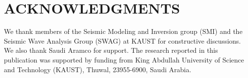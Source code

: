 \documentclass[paper,twocolomn]{geophysics}
\begin{document}


 




%


\section{ACKNOWLEDGMENTS}

We thank members of the Seismic Modeling and Inversion group (SMI) and the Seismic Wave Analysis Group (SWAG) at KAUST for constructive discussions. We also thank Saudi Aramco for support.
The research reported in this publication was supported by funding from King Abdullah University of Science and Technology (KAUST), Thuwal, 23955-6900, Saudi Arabia.
%
\newpage






\newpage


\end{document}

